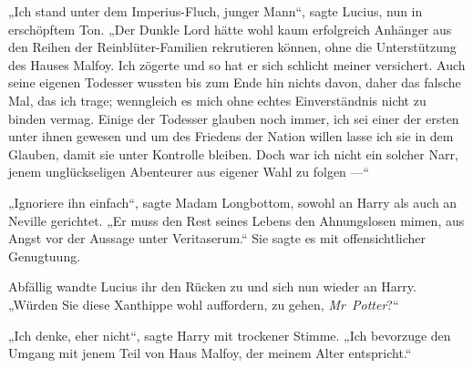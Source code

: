 „Ich stand unter dem Imperius-Fluch, junger Mann“, sagte Lucius, nun in erschöpftem Ton.
„Der Dunkle Lord hätte wohl kaum erfolgreich Anhänger aus den Reihen der Reinblüter-Familien rekrutieren können, ohne die Unterstützung des Hauses Malfoy. Ich zögerte und so hat er sich schlicht meiner versichert. Auch seine eigenen Todesser wussten bis zum Ende hin nichts davon, daher das falsche Mal, das ich trage; wenngleich es mich ohne echtes Einverständnis nicht zu binden vermag. Einige der Todesser glauben noch immer, ich sei einer der ersten unter ihnen gewesen und um des Friedens der Nation willen lasse ich sie in dem Glauben, damit sie unter Kontrolle bleiben. Doch war ich nicht ein solcher Narr, jenem unglückseligen Abenteurer aus eigener Wahl zu folgen —“

„Ignoriere ihn einfach“, sagte Madam Longbottom, sowohl an Harry als auch an Neville gerichtet.
„Er muss den Rest seines Lebens den Ahnungslosen mimen, aus Angst vor der Aussage unter Veritaserum.“ Sie sagte es mit offensichtlicher Genugtuung.

Abfällig wandte Lucius ihr den Rücken zu und sich nun wieder an Harry.
„Würden Sie diese Xanthippe wohl auffordern, zu gehen, \emph{Mr~Potter}?“%

„Ich denke, eher nicht“, sagte Harry mit trockener Stimme.
„Ich bevorzuge den Umgang mit jenem Teil von Haus Malfoy, der meinem Alter entspricht.“

